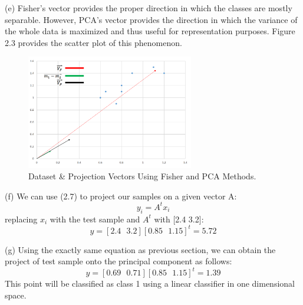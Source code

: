 \documentclass[12pt]{article}
\numberwithin{equation}{section}
\numberwithin{table}{section}
\numberwithin{figure}{section}
\begin{document}
(e) Fisher's vector provides the proper direction in which the classes are mostly separable. However, PCA's vector provides the direction in which the variance of the whole data is maximized and thus useful for representation purposes. Figure 2.3 provides the scatter plot of this phenomenon.
		\begin{figure}[!h]\centering
	\includegraphics[width=0.65\textwidth]{2_e.PNG}
	\caption{Dataset \& Projection Vectors Using Fisher and PCA Methods.}
	\label{pl1}
\end{figure}

(f) We can use (2.7) to project our samples on a given vector A:
\begin{equation}
	y_i = A^t x_i
\end{equation}
replacing $x_i$ with the test sample and $A^t$ with [2.4 3.2]:
$$
	y = [2.4 \ \ \ 3.2][0.85\ \ \ 1.15]^t = 5.72
$$

(g) Using the exactly same equation as previous section, we can obtain the project of test sample onto the principal component as follows:
$$
	y = [0.69 \ \ \ 0.71][0.85\ \ \ 1.15]^t = 1.39
$$	
This point will be classified as class 1 using a linear classifier in one dimensional space.
\end{document}
